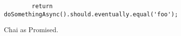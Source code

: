 \begin{figure}[H]
	\centering
	\begin{lstlisting}
		return doSomethingAsync().should.eventually.equal('foo');
	\end{lstlisting}
	\caption[Chai as Promised]{Chai as Promised.}
    \label{fig:chai_as_promised}
\end{figure}
